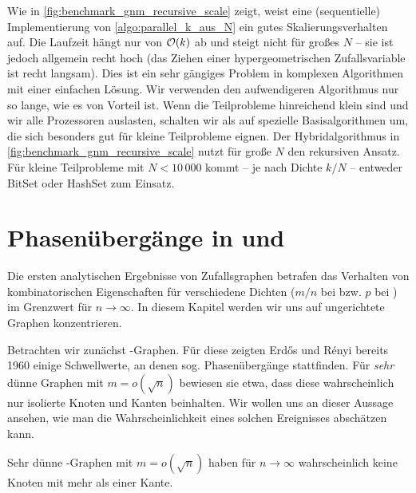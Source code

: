 Wie in \cref{fig:benchmark_gnm_recursive_scale} zeigt, weist eine (sequentielle) Implementierung von \cref{algo:parallel_k_aus_N} ein gutes Skalierungsverhalten auf.
Die Laufzeit hängt nur von $\mathcal{O}\!\left(k\right)$ ab und steigt nicht für großes $N$ -- sie ist jedoch allgemein recht hoch (das Ziehen einer hypergeometrischen Zufallsvariable ist recht langsam).
Dies  ist ein sehr gängiges Problem in komplexen Algorithmen mit einer einfachen Lösung.
Wir verwenden den aufwendigeren Algorithmus nur so lange, wie es von Vorteil ist.
Wenn die Teilprobleme hinreichend klein sind und wir alle Prozessoren auslasten, schalten wir als  auf spezielle Basisalgorithmen um, die sich besonders gut für kleine Teilprobleme eignen.
Der Hybridalgorithmus in \cref{fig:benchmark_gnm_recursive_scale} nutzt für große $N$ den rekursiven Ansatz.
Für kleine Teilprobleme mit $N < 10\,000$ kommt  -- je nach Dichte $k/N$ -- entweder BitSet oder HashSet zum Einsatz.

\section{Phasenübergänge in \Gnp und \Gnm}
Die ersten analytischen Ergebnisse von Zufallsgraphen betrafen das Verhalten von kombinatorischen Eigenschaften für verschiedene Dichten (\dh $m/n$ bei \Gnm bzw. $p$ bei \Gnp) im Grenzwert für $n \to \infty$.
In  diesem Kapitel werden wir uns auf ungerichtete Graphen konzentrieren.

Betrachten wir zunächst \Gnm-Graphen.
Für diese zeigten Erd\H{o}s und R\'enyi bereits 1960 einige Schwellwerte, an denen sog. Phasenübergänge stattfinden.
Für \emph{sehr} dünne Graphen mit $m = o(\sqrt n)$ bewiesen sie etwa, dass diese wahrscheinlich nur isolierte Knoten und Kanten beinhalten.
Wir wollen uns an dieser Aussage ansehen, wie man die Wahrscheinlichkeit eines solchen Ereignisses abschätzen kann.

\begin{lemma}
    Sehr dünne \Gnm-Graphen mit $m = o(\sqrt n)$ haben für $n \to \infty$ wahrscheinlich keine Knoten mit mehr als einer Kante.
\end{lemma}

